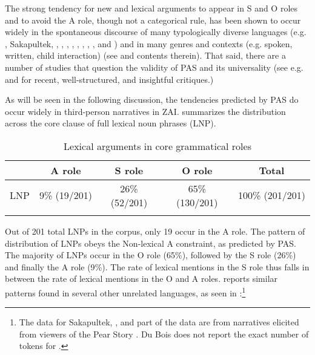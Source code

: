 The strong tendency for new and lexical arguments to appear in S and O roles and to avoid the A role, though not a categorical rule, has been shown to occur widely in the spontaneous discourse of many typologically diverse languages (e.g. , Sakapultek, , , , , , , , ,  and ) and in many genres and contexts (e.g. spoken, written, child interaction) (see \citealt{dubois2003} and contents therein). That said, there are a number of studies that question the validity of PAS and its universality (see e.g. \citealt{haig2016} and \citealt{schnell2017} for recent, well-structured, and insightful critiques.)

\largerpage
As will be seen in the following discussion, the tendencies predicted by PAS do occur widely in third-person narratives in ZAI.  summarizes the distribution across the core clause of full lexical noun phrases (LNP).
\clearpage

\begin{table} 

\caption{{Lexical arguments in core grammatical roles}}
\begin{tabular}{ l  c  c  c  c }
\lsptoprule
 & A role & S role & O role &  {Total} \\

\midrule
 \textsc{LNP} & 9{\%} (19/201) & 26{\%}(52/201) & 65{\%} (130/201) & 100{\%} (201/201) \\
  
\lspbottomrule
\end{tabular}
\label{generaldist} 
\end{table}

Out of 201 total LNPs in the corpus, only 19 occur in the A role. The pattern of distribution of LNPs obeys the Non-lexical A constraint, as predicted by PAS. The majority of LNPs occur in the O role (65{\%}), followed by the S role (26{\%}) and finally the A role (9{\%}).  The rate of lexical mentions in the S role thus falls in between the rate of lexical mentions in the O and A roles. \citet[37]{dubois2003b} reports similar patterns found in several other unrelated languages, as seen in :\footnote{The data for Sakapultek, ,  and part of the  data are from narratives elicited from viewers of the Pear Story \citep[62--63]{dubois2003a}. Du Bois does not report the exact number of tokens for .}


